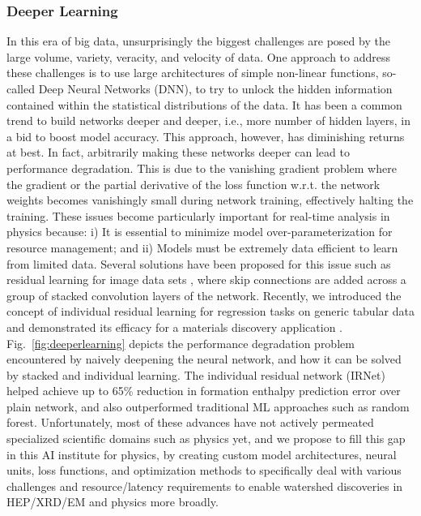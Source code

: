 \subsubsection{Deeper Learning}
In this era of big data, unsurprisingly the biggest challenges are posed by the large volume, variety, veracity, and velocity of data. One approach to address these challenges is to use large architectures of simple non-linear functions, so-called Deep Neural Networks (DNN), to try to unlock the hidden information contained within the statistical distributions of the data. 
It has been a common trend to build networks deeper and deeper, i.e., more number of hidden layers, in a bid to boost model accuracy. This approach, however, has diminishing returns at best. In fact, arbitrarily making these networks deeper can lead to performance degradation. This is due to the vanishing gradient problem where the gradient or the partial derivative of the loss function w.r.t. the network weights becomes vanishingly small during network training, effectively halting the training. These issues become particularly important for real-time analysis in physics because: i) It is essential to minimize model over-parameterization for resource management; and ii) Models must be extremely data efficient to learn from limited data. Several solutions have been proposed for this issue such as residual learning for image data sets \cite{He_2016_CVPR}, where skip connections are added across a group of stacked convolution layers of the network. Recently, we introduced the concept of individual residual learning for regression tasks on generic tabular data and demonstrated its efficacy for a materials discovery application \cite{Jha_KDD19}. Fig.~\ref{fig:deeperlearning} depicts the performance degradation problem encountered by naively deepening the neural network, and how it can be solved by stacked and individual learning. The individual residual network (IRNet) helped achieve up to 65\% reduction in formation enthalpy prediction error over plain network, and also outperformed traditional ML approaches such as random forest. Unfortunately, most of these advances have not actively permeated specialized scientific domains such as physics yet, and we propose to fill this gap in this AI institute for physics, by creating custom model architectures, neural units, loss functions, and optimization methods to specifically deal with various challenges and resource/latency requirements to enable watershed discoveries in HEP/XRD/EM and physics more broadly. 


